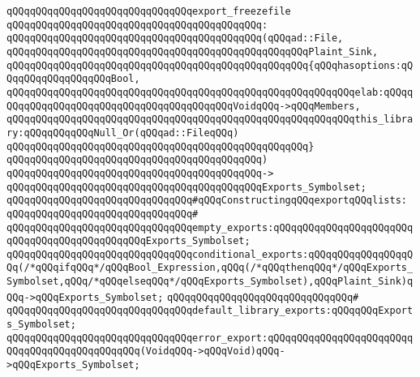 \newline
\verb|qQQqqQQqqQQqqQQqqQQqqQQqqQQqqQQqexport_freezefile|\newline
\verb|qQQqqQQqqQQqqQQqqQQqqQQqqQQqqQQqqQQqqQQqqQQq:|\newline
\verb|qQQqqQQqqQQqqQQqqQQqqQQqqQQqqQQqqQQqqQQqqQQq(qQQqad::File,|\newline
\verb|qQQqqQQqqQQqqQQqqQQqqQQqqQQqqQQqqQQqqQQqqQQqqQQqqQQqPlaint_Sink,|\newline
\verb|qQQqqQQqqQQqqQQqqQQqqQQqqQQqqQQqqQQqqQQqqQQqqQQqqQQq{qQQqhasoptions:qQQqqQQqqQQqqQQqqQQqBool,|\newline
\verb|qQQqqQQqqQQqqQQqqQQqqQQqqQQqqQQqqQQqqQQqqQQqqQQqqQQqqQQqqQQqelab:qQQqqQQqqQQqqQQqqQQqqQQqqQQqqQQqqQQqqQQqqQQqVoidqQQq->qQQqMembers,|\newline
\verb|qQQqqQQqqQQqqQQqqQQqqQQqqQQqqQQqqQQqqQQqqQQqqQQqqQQqqQQqqQQqthis_library:qQQqqQQqqQQqNull_Or(qQQqad::FileqQQq)|\newline
\verb|qQQqqQQqqQQqqQQqqQQqqQQqqQQqqQQqqQQqqQQqqQQqqQQqqQQq}|\newline
\verb|qQQqqQQqqQQqqQQqqQQqqQQqqQQqqQQqqQQqqQQqqQQq)|\newline
\verb|qQQqqQQqqQQqqQQqqQQqqQQqqQQqqQQqqQQqqQQqqQQq->|\newline
\verb|qQQqqQQqqQQqqQQqqQQqqQQqqQQqqQQqqQQqqQQqqQQqExports_Symbolset;|\newline
\newline
\verb|qQQqqQQqqQQqqQQqqQQqqQQqqQQqqQQq#qQQqConstructingqQQqexportqQQqlists:|\newline
\verb|qQQqqQQqqQQqqQQqqQQqqQQqqQQqqQQq#|\newline
\verb|qQQqqQQqqQQqqQQqqQQqqQQqqQQqqQQqempty_exports:qQQqqQQqqQQqqQQqqQQqqQQqqQQqqQQqqQQqqQQqqQQqqQQqExports_Symbolset;|\newline
\verb|qQQqqQQqqQQqqQQqqQQqqQQqqQQqqQQqconditional_exports:qQQqqQQqqQQqqQQqqQQq(/*qQQqifqQQq*/qQQqBool_Expression,qQQq(/*qQQqthenqQQq*/qQQqExports_Symbolset,qQQq/*qQQqelseqQQq*/qQQqExports_Symbolset),qQQqPlaint_Sink)qQQq->qQQqExports_Symbolset;|\newline
\verb|qQQqqQQqqQQqqQQqqQQqqQQqqQQqqQQq#|\newline
\verb|qQQqqQQqqQQqqQQqqQQqqQQqqQQqqQQqdefault_library_exports:qQQqqQQqExports_Symbolset;|\newline
\verb|qQQqqQQqqQQqqQQqqQQqqQQqqQQqqQQqerror_export:qQQqqQQqqQQqqQQqqQQqqQQqqQQqqQQqqQQqqQQqqQQqqQQq(VoidqQQq->qQQqVoid)qQQq->qQQqExports_Symbolset;|\newline
\newline
